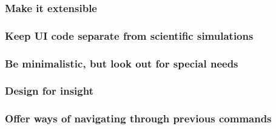 \subsubsection{Make it extensible}

\subsubsection{Keep UI code separate from scientific simulations}

\subsubsection{Be minimalistic, but look out for special needs}

\subsubsection{Design for insight}

\subsubsection{Offer ways of navigating through previous commands}

